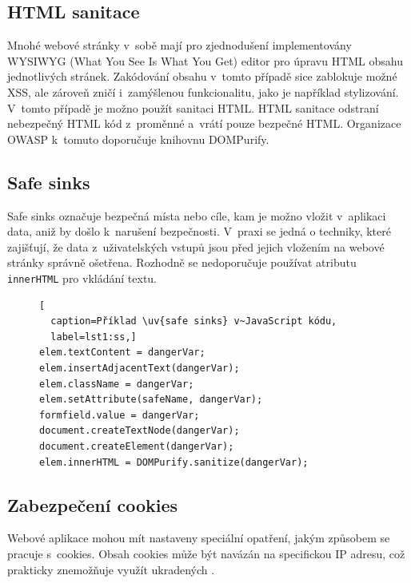 \documentclass[11pt, conference, a4paper]{IEEEtran}
\begin{document}
\subsection{HTML sanitace} %
Mnohé webové stránky v~sobě mají pro zjednodušení implementovány WYSIWYG (What You See Is What You Get) editor pro úpravu HTML obsahu jednotlivých stránek. Zakódování obsahu v~tomto případě sice zablokuje možné XSS, ale zároveň zničí i~zamýšlenou funkcionalitu, jako je například stylizování. V~tomto případě je možno použít sanitaci HTML. HTML sanitace odstraní nebezpečný HTML kód z~proměnné a~vrátí pouze bezpečné HTML. Organizace OWASP k~tomuto doporučuje knihovnu DOMPurify. 


\subsection{Safe sinks}
Safe sinks označuje bezpečná místa nebo cíle, kam je možno vložit v~aplikaci data, aniž by došlo k~narušení bezpečnosti. V~praxi se jedná o techniky, které zajišťují, že data z~uživatelských vstupů jsou před jejich vložením na webové stránky správně ošetřena. Rozhodně se nedoporučuje používat atributu \texttt{innerHTML} pro vkládání textu.~\cite{Prevention-XSS-owasp}

\begin{figure}[H]
\begin{lstlisting}[
  caption=Příklad \uv{safe sinks} v~JavaScript kódu,
  label=lst1:ss,]
elem.textContent = dangerVar;
elem.insertAdjacentText(dangerVar);
elem.className = dangerVar;
elem.setAttribute(safeName, dangerVar);
formfield.value = dangerVar;
document.createTextNode(dangerVar);
document.createElement(dangerVar);
elem.innerHTML = DOMPurify.sanitize(dangerVar);
\end{lstlisting}
\end{figure}

\subsection{Zabezpečení cookies}
Webové aplikace mohou mít nastaveny speciální opatření, jakým způsobem se pracuje s~cookies. Obsah cookies může být navázán na specifickou IP adresu, což prakticky znemožňuje využít ukradených .~\cite{XSS-cloudflare}
\end{document}
